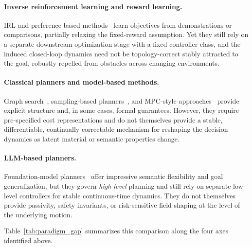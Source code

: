 \paragraph{Inverse reinforcement learning and reward learning.}
IRL and preference-based methods~\citep{ziebart2008maximum,christiano2017deep}
learn objectives from demonstrations or comparisons, partially relaxing the
fixed-reward assumption.
Yet they still rely on a separate downstream optimization stage with a
fixed controller class, and the induced closed-loop dynamics need not be
topology-correct stably attracted to the goal, robustly repelled from obstacles across changing environments.

\paragraph{Classical planners and model-based methods.}
Graph search~\citep{hart1968formal}, sampling-based
planners~\citep{karaman2011sampling}, and MPC-style
approaches~\citep{williams2017mppi} provide explicit structure and, in some
cases, formal guarantees.
However, they require pre-specified cost representations and do not
themselves provide a stable, differentiable, continually correctable mechanism
for reshaping the decision dynamics as latent material or semantic properties
change.

\paragraph{LLM-based planners.}
Foundation-model planners~\citep{ahn2022saycan,liang2022code} offer impressive
semantic flexibility and goal generalization, but they govern
\emph{high-level} planning and still rely on separate low-level controllers
for stable continuous-time dynamics.
They do not themselves provide passivity, safety invariants, or risk-sensitive
field shaping at the level of the underlying motion.

Table~\ref{tab:paradigm_gap} summarizes this comparison along the four
axes identified above.

